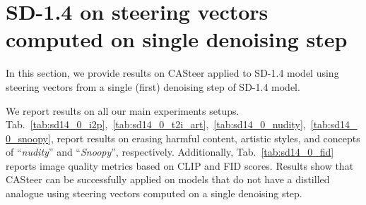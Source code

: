 





\clearpage
\section{SD-1.4 on steering vectors computed on single denoising step}
\label{sd14_on_sd14_0}

In this section, we provide results on CASteer applied to SD-1.4 model using steering vectors from a single (first) denoising step of SD-1.4 model.

We report results on all our main experiments setups. Tab.~\ref{tab:sd14_0_i2p},~\ref{tab:sd14_0_t2i_art},~\ref{tab:sd14_0_nudity},~\ref{tab:sd14_0_snoopy}, report results on erasing harmful content, artistic styles, and concepts of ``\textit{nudity}'' and ``\textit{Snoopy}'', respectively. Additionally, Tab.~\ref{tab:sd14_0_fid} reports image quality metrics based on CLIP and FID scores. Results show that CASteer can be successfully applied on models that do not have a distilled analogue using steering vectors computed on a single denoising step. 












